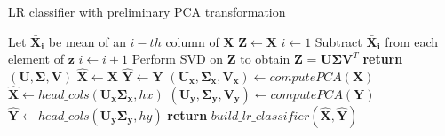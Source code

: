 \begin{algorithm}
    \caption{LR classifier with preliminary PCA transformation}\label{alg:pca1}
    \begin{algorithmic}[1]
    
        \State Let $\boldsymbol{\bar{X}_i}$ be mean of an $i-th$ column of $\boldsymbol{X}$
        \State $\boldsymbol{Z} \gets \boldsymbol{X}$
        \State $i \gets 1$
            \State Subtract $\boldsymbol{\bar{X}_i}$ from each element of $\boldsymbol{z}$ 
            \State $i \gets i+1$ 
        \EndFor
        \State Perform SVD on $\boldsymbol{Z}$ to obtain $\boldsymbol{Z}$ = $\boldsymbol{U}\boldsymbol{\Sigma}\boldsymbol{V}^T$
        \State \textbf{return} $(\boldsymbol{U}, \boldsymbol{\Sigma}, \boldsymbol{V})$
    \EndFunction
    \State
        \State $\boldsymbol{\hat{X}} \gets \boldsymbol{X}$ 
        \State $\boldsymbol{\hat{Y}} \gets \boldsymbol{Y}$ 
            \State $(\boldsymbol{U_x}, \boldsymbol{\Sigma_{x}}, \boldsymbol{V_x}) \gets  computePCA(\boldsymbol{X})$
            \State $\boldsymbol{\hat{X}} \gets head\_cols(\boldsymbol{U_x\Sigma_{x}}, hx)$
        \EndIf
            \State $(\boldsymbol{U_y}, \boldsymbol{\Sigma_{y}}, \boldsymbol{V_y}) \gets computePCA(\boldsymbol{Y})$
            \State $\boldsymbol{\hat{Y}} \gets head\_cols(\boldsymbol{U_y\Sigma_{y}}, hy)$
        \EndIf
        \State \textbf{return} $build\_lr\_classifier(\boldsymbol{\hat{X}}, \boldsymbol{\hat{Y}})$ 
    \EndFunction
    \end{algorithmic}
\end{algorithm}


